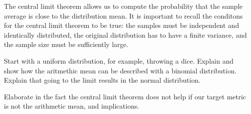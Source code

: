 The central limit theorem allows us to compute the probability that the sample average is close to the distribution mean. It is important to recall the conditons for the central limit theorem to be true: the samples must be independent and identically distributed, the original distribution has to have a finite variance, and the sample size must be sufficiently large.

\begin{example}
{\color{red} Start with a uniform distribution, for example, throwing a dice. Explain and show how the aritmethic mean can be described with a binomial distribution. Explain that going to the limit results in the normal distribution.}
\end{example}

{\color{red} Elaborate in the fact the central limit theorem does not help if our target metric is not the arithmetic mean, and implications.}

